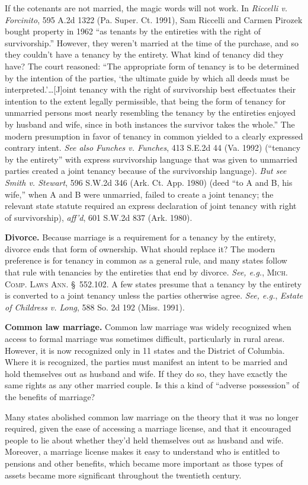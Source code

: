 If the cotenants are not married, the magic words will not work. In
\emph{Riccelli v. Forcinito}, 595 A.2d 1322 (Pa. Super. Ct. 1991), Sam Riccelli
and Carmen Pirozek bought property in 1962 ``as tenants by the entireties with
the right of survivorship.'' However, they weren't married at the time of the
purchase, and so they couldn't have a tenancy by the entirety. What kind of
tenancy did they have? The court reasoned: ``The appropriate form of tenancy is
to be determined by the intention of the parties, `the ultimate guide by which
all deeds must be interpreted.'\dots [J]oint tenancy with the right of
survivorship best effectuates their intention to the extent legally
permissible, that being the form of tenancy for unmarried persons most nearly
resembling the tenancy by the entireties enjoyed by husband and wife, since in
both instances the survivor takes the whole.'' The modern presumption in favor
of tenancy in common yielded to a clearly expressed contrary intent.
\textit{See also Funches v. Funches}, 413 S.E.2d 44 (Va. 1992) (``tenancy by
the entirety'' with express survivorship language that was given to unmarried
parties created a joint tenancy because of the survivorship language).
\textit{But see Smith v. Stewart}, 596 S.W.2d 346 (Ark. Ct. App. 1980) (deed
``to A and B, his wife,'' when A and B were unmarried, failed to create a joint
tenancy; the relevant state statute required an express declaration of joint
tenancy with right of survivorship), \emph{aff'd}, 601 S.W.2d 837 (Ark. 1980).



\item \textbf{Divorce.} Because marriage is a requirement for a tenancy by the
entirety, divorce ends that form of ownership. What should replace it? The
modern preference is for tenancy in common as a general rule, and many states
follow that rule with tenancies by the entireties that end by divorce.
\emph{See, e.g.}, \textsc{Mich. Comp. Laws Ann.} \S~552.102. A few states
presume that a tenancy by the entirety is converted to a joint tenancy unless
the parties otherwise agree. \emph{See, e.g.}, \emph{Estate of Childress v.
Long}, 588 So. 2d 192 (Miss. 1991).


\item \textbf{Common law marriage.} Common law marriage was widely recognized
when access to formal marriage was sometimes difficult, particularly in rural
areas. However, it is now recognized only in 11 states and the District of
Columbia. Where it is recognized, the parties must manifest an intent to be
married and hold themselves out as husband and wife. If they do so, they have
exactly the same rights as any other married couple. Is this a kind of
``adverse possession'' of the benefits of marriage?


Many states abolished common law marriage on the theory that it was no longer
required, given the ease of accessing a marriage license, and that it
encouraged people to lie about whether they'd held themselves out as husband
and wife. Moreover, a marriage license makes it easy to understand who is
entitled to pensions and other benefits, which became more important as those
types of assets became more significant throughout the twentieth century.

